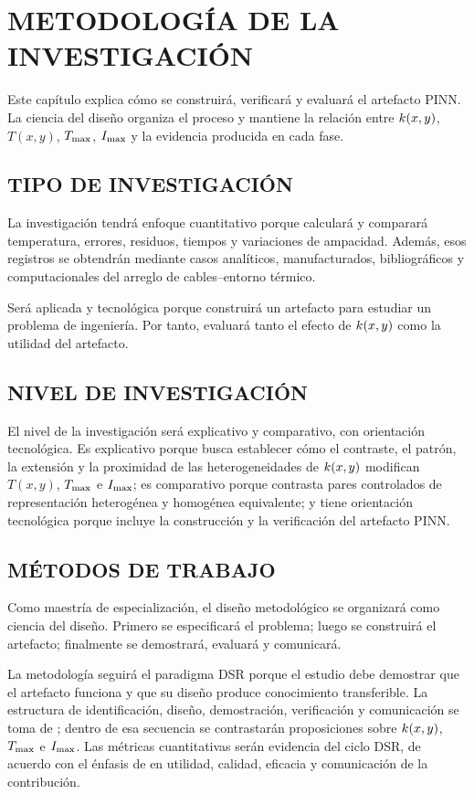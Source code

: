 \chapter{METODOLOGÍA DE LA INVESTIGACIÓN}
\label{ch:metodologia}
\thispagestyle{empty}

Este capítulo explica cómo se construirá, verificará y evaluará el artefacto PINN. La ciencia del diseño organiza el proceso y mantiene la relación entre $k(x,y)$, $T(x,y)$, $T_{\max}$, $I_{\max}$ y la evidencia producida en cada fase.

\section{TIPO DE INVESTIGACIÓN}
\label{sec:metodologia}

La investigación tendrá enfoque cuantitativo porque calculará y comparará temperatura, errores, residuos, tiempos y variaciones de ampacidad. Además, esos registros se obtendrán mediante casos analíticos, manufacturados, bibliográficos y computacionales del arreglo de cables--entorno térmico.

Será aplicada y tecnológica porque construirá un artefacto para estudiar un problema de ingeniería. Por tanto, evaluará tanto el efecto de $k(x,y)$ como la utilidad del artefacto.

\section{NIVEL DE INVESTIGACIÓN}

El nivel de la investigación será explicativo y comparativo, con orientación tecnológica. Es explicativo porque busca establecer cómo el contraste, el patrón, la extensión y la proximidad de las heterogeneidades de $k(x,y)$ modifican $T(x,y)$, $T_{\max}$ e $I_{\max}$; es comparativo porque contrasta pares controlados de representación heterogénea y homogénea equivalente; y tiene orientación tecnológica porque incluye la construcción y la verificación del artefacto PINN.

\section{MÉTODOS DE TRABAJO}

Como maestría de especialización, el diseño metodológico se organizará como ciencia del diseño. Primero se especificará el problema; luego se construirá el artefacto; finalmente se demostrará, evaluará y comunicará.

La metodología seguirá el paradigma DSR porque el estudio debe demostrar que el artefacto funciona y que su diseño produce conocimiento transferible. La estructura de identificación, diseño, demostración, verificación y comunicación se toma de \textcite[55--56]{peffers2007}; dentro de esa secuencia se contrastarán proposiciones sobre $k(x,y)$, $T_{\max}$ e $I_{\max}$. Las métricas cuantitativas serán evidencia del ciclo DSR, de acuerdo con el énfasis de \textcite[349--351]{gregor2013} en utilidad, calidad, eficacia y comunicación de la contribución. 


